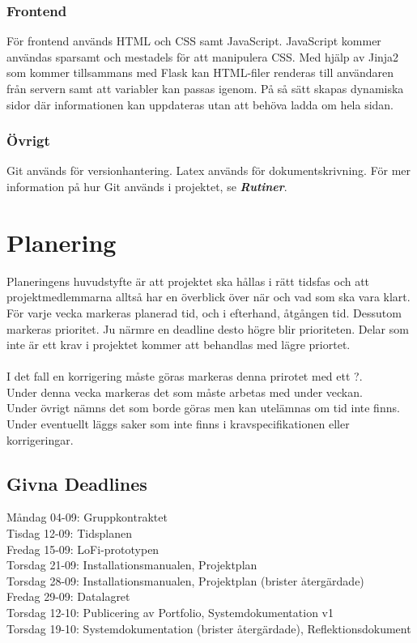 \documentclass{TDP003mall}
\begin{document}
\subsubsection{Frontend}
För frontend används HTML och CSS samt JavaScript. JavaScript kommer användas sparsamt
och mestadels för att manipulera CSS. Med hjälp av Jinja2 som kommer tillsammans med Flask kan
HTML-filer renderas till användaren från servern samt att variabler kan passas igenom.
På så sätt skapas dynamiska sidor där informationen kan uppdateras utan att behöva
ladda om hela sidan.

\subsubsection{Övrigt}
Git används för versionhantering. Latex används för dokumentskrivning. För mer information
på hur Git används i projektet, se \textbf{\textit{Rutiner}}.


\section{Planering}
Planeringens huvudstyfte är att projektet ska hållas i rätt tidsfas och att projektmedlemmarna alltså har en överblick över när och vad som ska vara klart.
För varje vecka markeras planerad tid, och i efterhand, åtgången tid. Dessutom markeras prioritet. Ju närmre en deadline desto högre blir prioriteten.
Delar som inte är ett krav i projektet kommer att behandlas med lägre priortet.\\\\
I det fall en korrigering måste göras markeras denna prirotet med ett ?. \\
Under denna vecka markeras det som måste arbetas med under veckan.\\
Under övrigt nämns det som borde göras men kan utelämnas om tid inte finns.\\
Under eventuellt läggs saker som inte finns i kravspecifikationen eller korrigeringar. \\
\pagebreak

\subsection{Givna Deadlines}
Måndag 04-09: Gruppkontraktet\\
Tisdag 12-09: Tidsplanen\\
Fredag 15-09: LoFi-prototypen\\
Torsdag 21-09: Installationsmanualen, Projektplan\\
Torsdag 28-09: Installationsmanualen, Projektplan (brister återgärdade)\\
Fredag 29-09: Datalagret\\
Torsdag 12-10: Publicering av Portfolio, Systemdokumentation v1\\
Torsdag 19-10: Systemdokumentation (brister återgärdade), Reflektionsdokument\\
\end{document}
